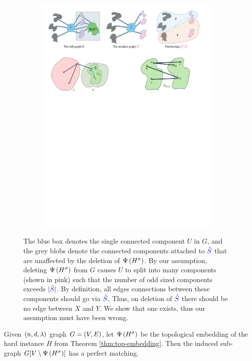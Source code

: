\documentclass[11pt]{article}
\begin{document}
\begin{figure}
\begin{subfigure}[t]{0.3\textwidth}
        \includegraphics[width=\textwidth]{assets/part-c.pdf}
        \caption{}
        \label{fig:contradiction}
    \end{subfigure}
    \caption{The blue box denotes the single connected component $U$ in $G$, and the grey blobs denote the connected components attached to $\textcolor{blue}{\hat{S}}$ that are unaffected by the deletion of $\Psi\left({H}^{\sigma}\right)$. By our assumption, deleting $\Psi\left({H}^{\sigma}\right)$ from $G$ causes $U$ to split into many components (shown in pink) such that the number of odd sized components exceeds $|\textcolor{blue}{\hat{S}}|$. By definition, all edges connections between these components should go via $\textcolor{blue}{\hat{S}}$. Thus, on deletion of $\textcolor{blue}{\hat{S}}$ there should be no edge between $X$ and $Y$. We show that one exists, thus our assumption must have been wrong.}
    \label{fig:three-images}
\end{figure}


\begin{theorem}\label{thm:perfect-matching}
Given $(n, d, \lambda)$ graph $G=(V,E)$, let $\Psi\left({H}^{\sigma}\right)$ be the topological embedding of the hard instance $H$ from Theorem \ref{thm:top-embedding}.
Then the induced sub-graph $G[V \setminus \Psi\left({H}^{\sigma}\right)]$ has a perfect matching.	
	
\end{theorem}
\end{document}
